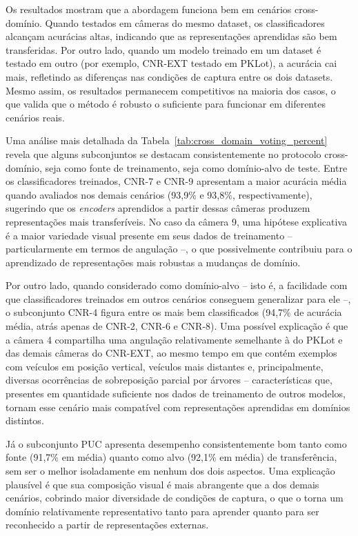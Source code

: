 \documentclass{article}
\begin{document}
Os resultados mostram que a abordagem funciona bem em cenários cross-domínio. Quando testados em câmeras do mesmo dataset, os classificadores alcançam acurácias altas, indicando que as representações aprendidas são bem transferidas. Por outro lado, quando um modelo treinado em um dataset é testado em outro (por exemplo, CNR-EXT testado em PKLot), a acurácia cai mais, refletindo as diferenças nas condições de captura entre os dois datasets. Mesmo assim, os resultados permanecem competitivos na maioria dos casos, o que valida que o método é robusto o suficiente para funcionar em diferentes cenários reais.

Uma análise mais detalhada da Tabela~\ref{tab:cross_domain_voting_percent} revela que alguns subconjuntos se destacam consistentemente no protocolo cross-domínio, seja como fonte de treinamento, seja como domínio-alvo de teste. Entre os classificadores treinados, CNR-7 e CNR-9 apresentam a maior acurácia média quando avaliados nos demais cenários (93,9\% e 93,8\%, respectivamente), sugerindo que os \textit{encoders} aprendidos a partir dessas câmeras produzem representações mais transferíveis. No caso da câmera 9, uma hipótese explicativa é a maior variedade visual presente em seus dados de treinamento -- particularmente em termos de angulação --, o que possivelmente contribuiu para o aprendizado de representações mais robustas a mudanças de domínio.

Por outro lado, quando considerado como domínio-alvo -- isto é, a facilidade com que classificadores treinados em outros cenários conseguem generalizar para ele --, o subconjunto CNR-4 figura entre os mais bem classificados (94,7\% de acurácia média, atrás apenas de CNR-2, CNR-6 e CNR-8). Uma possível explicação é que a câmera 4 compartilha uma angulação relativamente semelhante à do PKLot e das demais câmeras do CNR-EXT, ao mesmo tempo em que contém exemplos com veículos em posição vertical, veículos mais distantes e, principalmente, diversas ocorrências de sobreposição parcial por árvores -- características que, presentes em quantidade suficiente nos dados de treinamento de outros modelos, tornam esse cenário mais compatível com representações aprendidas em domínios distintos.

Já o subconjunto PUC apresenta desempenho consistentemente bom tanto como fonte (91,7\% em média) quanto como alvo (92,1\% em média) de transferência, sem ser o melhor isoladamente em nenhum dos dois aspectos. Uma explicação plausível é que sua composição visual é mais abrangente que a dos demais cenários, cobrindo maior diversidade de condições de captura, o que o torna um domínio relativamente representativo tanto para aprender quanto para ser reconhecido a partir de representações externas.
\end{document}
